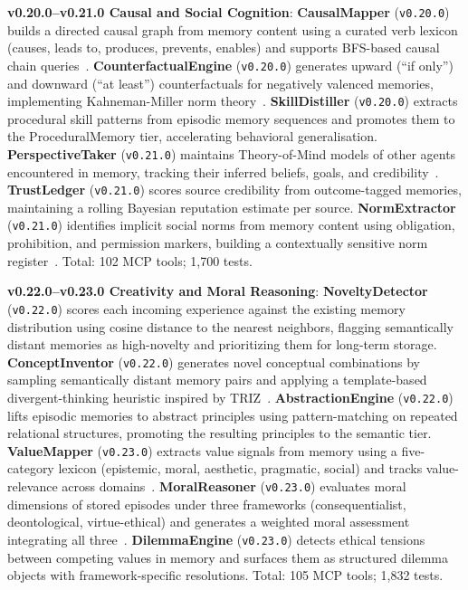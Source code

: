 \documentclass[conference]{IEEEtran}
\begin{document}
\textbf{v0.20.0--v0.21.0 Causal and Social Cognition}: \textbf{CausalMapper} (\texttt{v0.20.0}) builds a directed causal graph from memory content using a curated verb lexicon (causes, leads to, produces, prevents, enables) and supports BFS-based causal chain queries~\cite{pearl2000}. \textbf{CounterfactualEngine} (\texttt{v0.20.0}) generates upward (``if only'') and downward (``at least'') counterfactuals for negatively valenced memories, implementing Kahneman-Miller norm theory~\cite{kahneman1986}. \textbf{SkillDistiller} (\texttt{v0.20.0}) extracts procedural skill patterns from episodic memory sequences and promotes them to the ProceduralMemory tier, accelerating behavioral generalisation. \textbf{PerspectiveTaker} (\texttt{v0.21.0}) maintains Theory-of-Mind models of other agents encountered in memory, tracking their inferred beliefs, goals, and credibility~\cite{premack1978}. \textbf{TrustLedger} (\texttt{v0.21.0}) scores source credibility from outcome-tagged memories, maintaining a rolling Bayesian reputation estimate per source. \textbf{NormExtractor} (\texttt{v0.21.0}) identifies implicit social norms from memory content using obligation, prohibition, and permission markers, building a contextually sensitive norm register~\cite{bicchieri2006}. Total: 102 MCP tools; 1,700 tests.

\textbf{v0.22.0--v0.23.0 Creativity and Moral Reasoning}: \textbf{NoveltyDetector} (\texttt{v0.22.0}) scores each incoming experience against the existing memory distribution using cosine distance to the nearest neighbors, flagging semantically distant memories as high-novelty and prioritizing them for long-term storage. \textbf{ConceptInventor} (\texttt{v0.22.0}) generates novel conceptual combinations by sampling semantically distant memory pairs and applying a template-based divergent-thinking heuristic inspired by TRIZ~\cite{altshuller1996}. \textbf{AbstractionEngine} (\texttt{v0.22.0}) lifts episodic memories to abstract principles using pattern-matching on repeated relational structures, promoting the resulting principles to the semantic tier. \textbf{ValueMapper} (\texttt{v0.23.0}) extracts value signals from memory using a five-category lexicon (epistemic, moral, aesthetic, pragmatic, social) and tracks value-relevance across domains~\cite{schwartz1992}. \textbf{MoralReasoner} (\texttt{v0.23.0}) evaluates moral dimensions of stored episodes under three frameworks (consequentialist, deontological, virtue-ethical) and generates a weighted moral assessment integrating all three~\cite{rawls1971}. \textbf{DilemmaEngine} (\texttt{v0.23.0}) detects ethical tensions between competing values in memory and surfaces them as structured dilemma objects with framework-specific resolutions. Total: 105 MCP tools; 1,832 tests.
\end{document}

